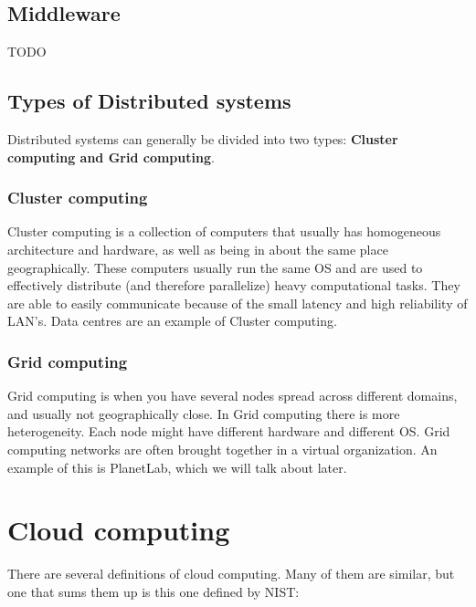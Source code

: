 \subsection{Middleware}
TODO

\subsection{Types of Distributed systems}
Distributed systems can generally be divided into two types: \textbf{Cluster computing and Grid computing}.

\subsubsection{Cluster computing}
Cluster computing is a collection of computers that usually has homogeneous architecture and hardware, as well as being in about the same place geographically. These computers usually run the same OS and are used to effectively distribute (and therefore parallelize) heavy computational tasks. They are able to easily communicate because of the small latency and high reliability of LAN's. Data centres are an example of Cluster computing. 

\subsubsection{Grid computing}
Grid computing is when you have several nodes spread across different domains, and usually not geographically close. In Grid computing there is more heterogeneity. Each node might have different hardware and different OS. Grid computing networks are often brought together in a virtual organization. An example of this is PlanetLab, which we will talk about later. 








\section{Cloud computing}
There are several definitions of cloud computing. Many of them are similar, but one that sums them up is this one defined by NIST\cite{mell_nist_nodate}:


